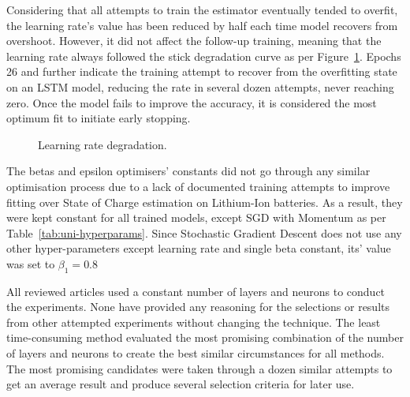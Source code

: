Considering that all attempts to train the estimator eventually tended to overfit, the learning rate's value has been reduced by half each time model recovers from overshoot.
However, it did not affect the follow-up training, meaning that the learning rate always followed the stick degradation curve as per Figure~\ref{fig:l_rate_progress}.
Epochs 26 and further indicate the training attempt to recover from the overfitting state on an LSTM model, reducing the rate in several dozen attempts, never reaching zero.
Once the model fails to improve the accuracy, it is considered the most optimum fit to initiate early stopping.

\begin{figure}[ht]
    \centering
    
    \caption{Learning rate degradation.}
    \label{fig:l_rate_progress}
\end{figure}

%
The betas and epsilon optimisers' constants did not go through any similar optimisation process due to a lack of documented training attempts to improve fitting over State of Charge estimation on Lithium-Ion batteries.
As a result, they were kept constant for all trained models, except SGD with Momentum as per \mbox{Table~\ref{tab:uni-hyperparams}}.
Since Stochastic Gradient Descent does not use any other hyper-parameters except learning rate and single beta constant, its' value was set to $\beta_1 = 0.8$
\begin{table}[htbp]
  \renewcommand{\arraystretch}{1.3}
  \caption{Optimisers Hyper-Parameters}
  \centering
  \label{tab:uni-hyperparams}
\end{table}

%
All reviewed articles used a constant number of layers and neurons to conduct the experiments.
None have provided any reasoning for the selections or results from other attempted experiments without changing the technique.
The least time-consuming method evaluated the most promising combination of the number of layers and neurons to create the best similar circumstances for all methods.
The most promising candidates were taken through a dozen similar attempts to get an average result and produce several selection criteria for later use.

